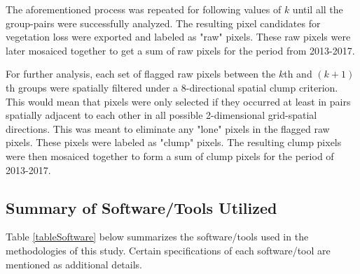 \justify
The aforementioned process was repeated for following values of $k$ until all the group-pairs were successfully analyzed. The resulting pixel candidates for vegetation loss were exported and labeled as "raw" pixels. These raw pixels were later mosaiced together to get a sum of raw pixels for the period from 2013-2017. 

\justify
For further analysis, each set of flagged raw pixels between the $k$th and $(k+1)$th groups were spatially filtered under a 8-directional spatial clump criterion. This would mean that pixels were only selected if they occurred at least in pairs spatially adjacent to each other in all possible 2-dimensional grid-spatial directions. This was meant to eliminate any "lone" pixels in the flagged raw pixels. These pixels were labeled as "clump" pixels. The resulting clump pixels were then mosaiced together to form a sum of clump pixels for the period of 2013-2017. 

\subsection{Summary of Software/Tools Utilized}

\justify
Table \ref{tableSoftware} below summarizes the software/tools used in the methodologies of this study. Certain specifications of each software/tool are mentioned as additional details.

